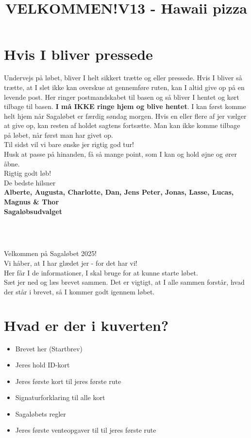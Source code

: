 \section{Hvis I bliver pressede}
Undervejs på løbet, bliver I helt sikkert trætte og eller pressede. Hvis I bliver så trætte, at I slet ikke kan overskue at gennemføre ruten, kan I altid give op på en levende post. Her ringer postmandskabet til basen og så bliver I hentet og kørt tilbage til basen. \textbf{I må IKKE ringe hjem og blive hentet}. I kan først komme helt hjem når Sagaløbet er færdig søndag morgen. Hvis en eller flere af jer vælger at give op, kan resten af holdet sagtens fortsætte. Man kan ikke komme tilbage på løbet, når først man har givet op.\\
\newline
Til sidst vil vi bare ønske jer rigtig god tur!\\
Husk at passe på hinanden, få så mange point, som I kan og hold øjne og ører åbne.\\
\newline
Rigtig godt løb!\\
\newline
\textcolor{søblå}{De bedste hilsner}\\
\textcolor{natblå}{\textbf{Alberte, Augusta, Charlotte, Dan, Jens Peter, Jonas, Lasse, Lucas, Magnus \& Thor}}\\
\textcolor{natblå}{\textbf{Sagaløbsudvalget}}\\
\newpage
\title{VELKOMMEN!}\\
\newline
\title{\textcolor{søblå}{V13 - Hawaii pizza }}\\
\newline
Velkommen på Sagaløbet 2025!\\
Vi håber, at I har glædet jer - for det har vi!\\
Her får I de informationer, I skal bruge for at kunne starte løbet.\\
Sæt jer ned og læs brevet sammen. Det er vigtigt, at I alle sammen forstår, hvad der står i brevet, så I kommer godt igennem løbet.
\section{Hvad er der i kuverten?}
\begin{itemize}
    \item Brevet her (Startbrev)
    \item Jeres hold ID-kort
    \item Jeres første kort til jeres første rute
    \item Signaturforklaring til alle kort
    \item Sagaløbets regler
    \item Jeres første venteopgaver til til jeres første rute
\end{itemize}

